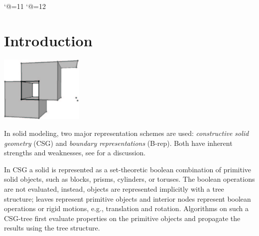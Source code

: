 
\ccParDims

\label{chapterNef3}



\begin{lcTexBlock}
  \catcode`@=11
  \gdef\pyr{\mathop{\operator@font Pyr}\nolimits}
  \gdef\aff{\mathop{\operator@font aff}\nolimits}
  \catcode`@=12
\end{lcTexBlock}
\lcHtml{
  \newcommand{\pyr}{Pyr}
  \newcommand{\aff}{aff}
}

\minitoc

\section{Introduction}

\begin{ccTexOnly}
    \vspace*{-20mm}
    \begin{flushright}
      \parbox{0.3\textwidth}{%
          \includegraphics[width=0.3\textwidth]{Nef_3/fig/nef_non_manifold3a}%
      }%
    \end{flushright}
\end{ccTexOnly}

In solid modeling, two major representation schemes are used:
\emph{constructive solid geometry} (CSG) and \emph{boundary
  representations} (B-rep). Both have inherent strengths and
weaknesses, see \cite{cgal:h-gsmi-89} for a discussion.

In CSG a solid is represented as a set-theoretic boolean combination
of primitive solid objects, such as blocks, prisms, cylinders, or
toruses.  The boolean operations are not evaluated, instead, objects
are represented implicitly with a tree structure; leaves represent
primitive objects and interior nodes represent boolean operations or
rigid motions, e.g., translation and rotation. Algorithms on such a
CSG-tree first evaluate properties on the primitive objects and
propagate the results using the tree structure.
 
